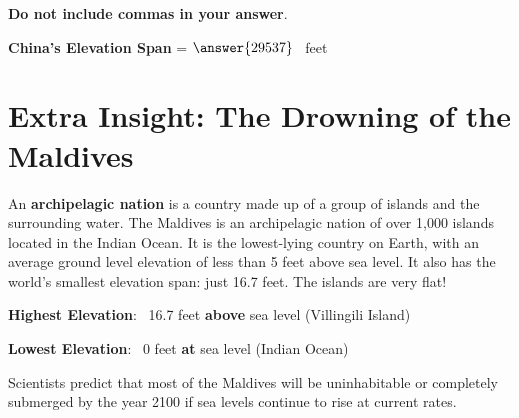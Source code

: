 \documentclass{ximera}[font=12pt]
\begin{document}
\begin{problem}
\begin{center}
\end{center}

\begin{multipleChoice}
\end{multipleChoice}


\textbf{Do not include commas in your answer}.

\textcolor{accessibleOrange}{\textbf{China's Elevation Span}} =  $\answer{29537}$ \ feet

\end{problem}


\section*{Extra Insight: The Drowning of the Maldives}

\normalsize
An \textbf{archipelagic nation} is a country made up of a group of islands and the surrounding water.  The Maldives 
is an archipelagic nation of over 1,000 islands located in the Indian Ocean.  It is the lowest-lying country on Earth, 
with an average ground level elevation of less than 5 feet above sea level.  It also has the world's smallest elevation 
span: just 16.7 feet.  The islands are very flat!

\textbf{Highest Elevation}: \  16.7 feet \textbf{above} sea level (Villingili Island)

\textbf{Lowest Elevation}: \  0 feet \textbf{at} sea level (Indian Ocean)


Scientists predict that most of the Maldives will be uninhabitable or completely submerged by the year 2100 if sea 
levels continue to rise at current rates.
\end{document}
